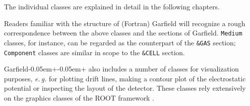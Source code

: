 The individual classes are explained in detail in the following chapters. 

Readers familiar with the structure 
of (Fortran) Garfield \cite{GarfieldFortran} will recognize a 
rough correspondence between 
the above classes and the sections of Garfield. 
\texttt{Medium} classes, for instance, can be regarded as the counterpart 
of the \texttt{\&GAS} section; 
\texttt{Component} classes are similar in 
scope to the \texttt{\&CELL} section.  
 
Garfield\kern-0.05em+\kern-0.05em+ also includes a number of classes for visualization purposes, 
\textit{e.\,g.} for plotting drift lines, making a contour plot of the electrostatic 
potential or inspecting the layout of the detector.   
These classes rely extensively on the graphics classes of the 
ROOT framework \cite{ROOT}.

